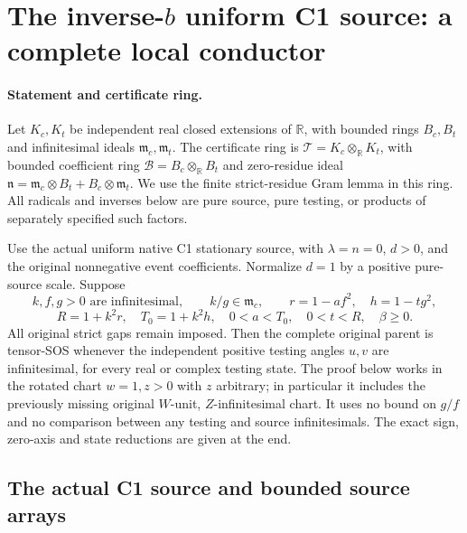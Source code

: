 \section{The inverse-$b$ uniform C1 source: a complete local conductor}
\label{sec:c1-inverse-b-local-new}

\paragraph{Statement and certificate ring.}
Let $K_c,K_t$ be independent real closed extensions of $\mathbb R$,
with bounded rings $B_c,B_t$ and infinitesimal ideals
$\mathfrak m_c,\mathfrak m_t$. The certificate ring is
$\mathcal T=K_c\otimes_{\mathbb R}K_t$, with bounded coefficient ring
$\mathcal B=B_c\otimes_{\mathbb R}B_t$ and zero-residue ideal
$\mathfrak n=\mathfrak m_c\otimes B_t+B_c\otimes\mathfrak m_t$.
We use the finite strict-residue Gram lemma in this ring.
All radicals and inverses below are pure source, pure testing, or
products of separately specified such factors.

Use the actual uniform native C1 stationary source, with
$\lambda=n=0$, $d>0$, and the original nonnegative event coefficients.
Normalize $d=1$ by a positive pure-source scale. Suppose
\[
 k,f,g>0\text{ are infinitesimal},\qquad k/g\in\mathfrak m_c,
 \qquad r=1-af^2,\quad h=1-tg^2,
\]
\[
 R=1+k^2r,\quad T_0=1+k^2h,\quad
 0<a<T_0,\quad 0<t<R,\quad \beta\geq0.                 \tag{IW1}
\]
All original strict gaps remain imposed. Then the complete original
parent is tensor-SOS whenever the independent positive testing angles
$u,v$ are infinitesimal, for every real or complex testing state.
The proof below works in the rotated chart $w=1,z>0$ with $z$ arbitrary;
in particular it includes the previously missing original
$W$-unit, $Z$-infinitesimal chart. It uses no bound on $g/f$ and no
comparison between any testing and source infinitesimals.
The exact sign, zero-axis and state reductions are given at the end.

\subsection{The actual C1 source and bounded source arrays}

